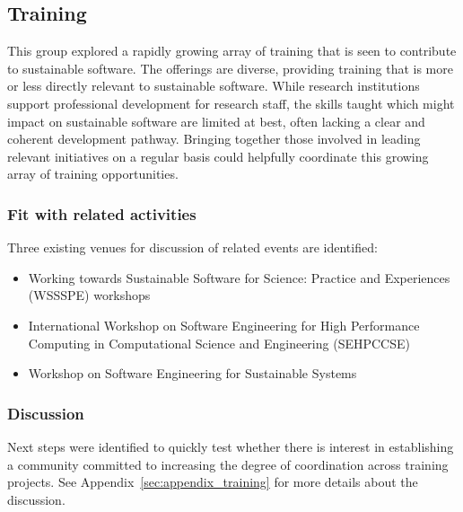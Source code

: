 \subsection{Training}


This group explored a rapidly growing array of training that is seen to
contribute to sustainable software. The offerings are diverse, providing
training that is more or less directly relevant to sustainable software. While
research institutions support professional development for research staff, the
skills taught which might impact on sustainable software are limited at best,
often lacking a clear and coherent development pathway. Bringing together those
involved in leading relevant initiatives on a regular basis could helpfully
coordinate this growing array of training opportunities.

\subsubsection{Fit with related activities} 

Three existing venues for discussion of related events are
identified:
%
\begin{itemize}

\item Working towards Sustainable Software for Science: Practice and
Experiences (WSSSPE) workshops~\cite{WSSSPE}

\item International Workshop on Software Engineering for High
Performance Computing in Computational Science and
Engineering (SEHPCCSE)~\cite{SEHPCCSE}

\item Workshop on Software Engineering for Sustainable Systems~\cite{se4susy}

\end{itemize}

\subsubsection{Discussion}

Next steps were identified to quickly test whether there is interest in
establishing a community committed to increasing the degree of coordination
across training projects. See Appendix~\ref{sec:appendix_training} for more
details about the discussion.

